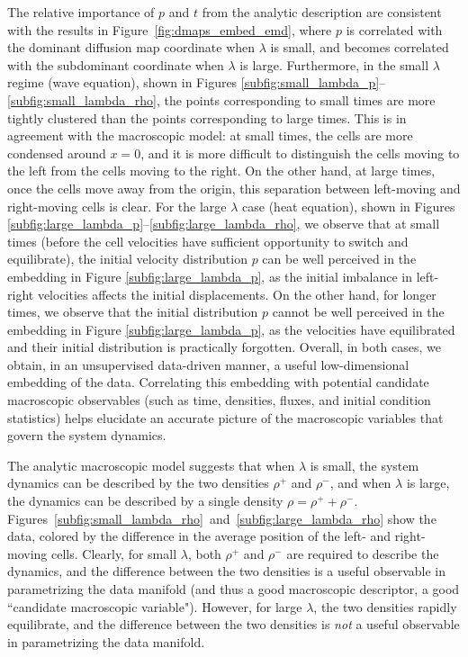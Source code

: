 \documentclass[3p]{elsarticle}
\begin{document}
The relative importance of $p$ and $t$ from the analytic description are consistent with the results 
in Figure~\ref{fig:dmaps_embed_emd}, where $p$ is correlated with the dominant diffusion map coordinate 
when $\lambda$ is small, and becomes correlated with the subdominant coordinate when $\lambda$ is large.
%
Furthermore, in the small $\lambda$ regime (wave equation), shown in 
Figures \ref{subfig:small_lambda_p}--\ref{subfig:small_lambda_rho}, the points corresponding to 
small times are more tightly clustered than the points corresponding to large times.
%
This is in agreement with the macroscopic model: at small times, the cells are more 
condensed around $x=0$, and it is more difficult to distinguish the cells moving to the left from the cells moving to the right.
%
On the other hand, at large times, once the cells move away from the origin, this separation between left-moving and
right-moving cells is clear.
%
For the large $\lambda$ case (heat equation), shown in Figures \ref{subfig:large_lambda_p}--\ref{subfig:large_lambda_rho}, 
we observe that at small times (before the cell velocities have sufficient opportunity to switch and equilibrate), the initial velocity distribution $p$ can be well perceived in the
embedding in Figure \ref{subfig:large_lambda_p}, as the initial imbalance in left-right velocities affects
the initial displacements.
%
On the other hand, for longer times, we observe that the initial distribution $p$ cannot be well perceived
in the embedding in Figure \ref{subfig:large_lambda_p}, 
as the velocities have equilibrated and their initial distribution is practically forgotten.
%
Overall, in both cases, we obtain, in an unsupervised data-driven manner, a useful low-dimensional embedding of the data.
%
Correlating this embedding with potential candidate macroscopic observables (such as time, densities, fluxes, and initial condition statistics) helps elucidate
an accurate picture of the macroscopic variables that govern the system dynamics.

The analytic macroscopic model suggests that when $\lambda$ is small, the system dynamics 
can be described by the two densities $\rho^+$ and $\rho^-$, 
and when $\lambda$ is large, the dynamics can be described by a single density $\rho = \rho^+ + \rho^-$.
%
Figures~\ref{subfig:small_lambda_rho}~and~\ref{subfig:large_lambda_rho} show the data, 
colored by the difference in the average position of the left- and right-moving cells.
%
Clearly, for small $\lambda$, both $\rho^+$ and $\rho^-$ are required to describe the dynamics, and
the difference between the two densities is a useful observable in parametrizing the data manifold
(and thus a good macroscopic descriptor, a good ``candidate macroscopic variable").
%
However, for large $\lambda$, the two densities rapidly equilibrate, and the difference between the two 
densities is {\em not} a useful observable in parametrizing the data manifold. 
\end{document}
